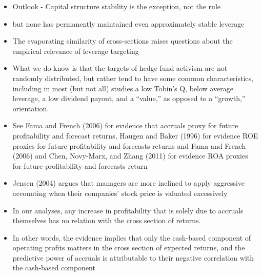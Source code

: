 \documentclass[12pt]{article}
\begin{document}
        \begin{itemize}

            \item Outlook - Capital structure stability is the exception, not the rule \citep{Deangelo2015}

            \item but none has permanently maintained even approximately stable leverage \citep{Deangelo2015}

            \item The evaporating similarity of cross-sections raises questions about the empirical relevance of leverage targeting \citep{Deangelo2015}

            \item What we do know is that the targets of hedge fund activism are not randomly distributed, but rather tend to have some common characteristics, including in most (but not all) studies a low Tobin’s Q, below average leverage, a low dividend payout, and a “value,” as opposed to a “growth,” orientation. \citep{CoffeeJr.2014}


            \item See Fama and French (2006) for evidence that accruals proxy for future profitability and forecast returns, Haugen and Baker (1996) for evidence ROE proxies for future profitability and forecasts returns and Fama and French (2006) and Chen, Novy-Marx, and Zhang (2011) for evidence ROA proxies for future profitability and forecasts return \citep{Choi2012}
            
            \item Jensen (2004) argues that managers are more inclined to apply aggressive accounting when their companies’ stock price is valuated excessively \citep{Mohr2012}

            
            \item In our analyses, any increase in profitability that is solely due to accruals themselves has no relation with the cross section of returns.\citep{Ball2016}

            \item In other words, the evidence implies that only the cash-based component of operating profits matters in the cross section of expected returns, and the predictive power of accruals is attributable to their negative correlation with the cash-based component \citep{Ball2016}

        \end{itemize}
\end{document}
